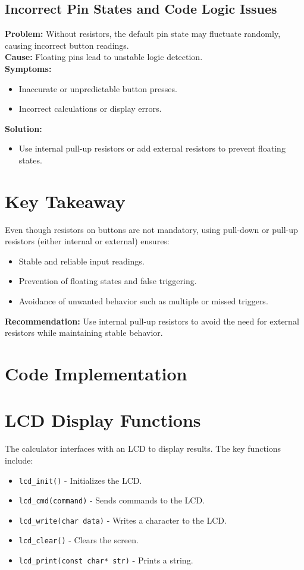 \documentclass[journal]{IEEEtran}
\begin{document}
\subsection*{Incorrect Pin States and Code Logic Issues}
\textbf{Problem:} Without resistors, the default pin state may fluctuate randomly, causing incorrect button readings. \\
\textbf{Cause:} Floating pins lead to unstable logic detection. \\
\textbf{Symptoms:}
\begin{itemize}
    \item Inaccurate or unpredictable button presses.
    \item Incorrect calculations or display errors.
\end{itemize}
\textbf{Solution:}
\begin{itemize}
    \item Use internal pull-up resistors or add external resistors to prevent floating states.
\end{itemize}

\section*{Key Takeaway}
Even though resistors on buttons are not mandatory, using pull-down or pull-up resistors (either internal or external) ensures:
\begin{itemize}
    \item Stable and reliable input readings.
    \item Prevention of floating states and false triggering.
    \item Avoidance of unwanted behavior such as multiple or missed triggers.
\end{itemize}

\textbf{Recommendation:} Use internal pull-up resistors to avoid the need for external resistors while maintaining stable behavior.







\section{Code Implementation}
\section*{LCD Display Functions}
The calculator interfaces with an LCD to display results. The key functions include:
\begin{itemize}
    \item \texttt{lcd\_init()} - Initializes the LCD.
    \item \texttt{lcd\_cmd(command)} - Sends commands to the LCD.
    \item \texttt{lcd\_write(char data)} - Writes a character to the LCD.
    \item \texttt{lcd\_clear()} - Clears the screen.
    \item \texttt{lcd\_print(const char* str)} - Prints a string.
\end{itemize}
\end{document}
